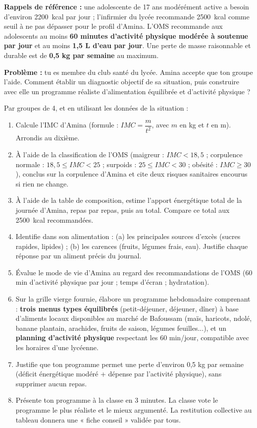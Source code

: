 \documentclass[11pt]{article}
\newcounter{popsec}
\newcounter{popsub}
\newcommand{\courssub}[1]{%
  \stepcounter{popsub}%
  \par\vspace{9pt}\noindent{\popxbold\fontsize{11.5}{13}\selectfont\color{popink}{\color{poporange}\thepopsec.\thepopsub}\hspace{6pt}#1}\par\nopagebreak\vspace{4pt}
}
\begin{document}
\textbf{Rappels de référence :} une adolescente de 17 ans modérément active a besoin d'environ \SI{2200}{kcal} par jour ; l'infirmier du lycée recommande \SI{2500}{kcal} comme seuil à ne pas dépasser pour le profil d'Amina. L'OMS recommande aux adolescents au moins \textbf{60 minutes d'activité physique modérée à soutenue par jour} et au moins \textbf{1,5 L d'eau par jour}. Une perte de masse raisonnable et durable est de \textbf{0,5 kg par semaine} au maximum.

\textbf{Problème :} tu es membre du club santé du lycée. Amina accepte que ton groupe l'aide. Comment établir un diagnostic objectif de sa situation, puis construire avec elle un programme réaliste d'alimentation équilibrée et d'activité physique ?

\courssub{Consignes}

Par groupes de 4, et en utilisant les données de la situation :

\begin{enumerate}
\item Calcule l'IMC d'Amina (formule : $IMC = \dfrac{m}{t^2}$, avec $m$ en kg et $t$ en m). Arrondis au dixième.
\item À l'aide de la classification de l'OMS (maigreur : $IMC < 18,5$ ; corpulence normale : $18,5 \leq IMC < 25$ ; surpoids : $25 \leq IMC < 30$ ; obésité : $IMC \geq 30$), conclus sur la corpulence d'Amina et cite deux risques sanitaires encourus si rien ne change.
\item À l'aide de la table de composition, estime l'apport énergétique total de la journée d'Amina, repas par repas, puis au total. Compare ce total aux \SI{2500}{kcal} recommandées.
\item Identifie dans son alimentation : (a) les principales sources d'excès (sucres rapides, lipides) ; (b) les carences (fruits, légumes frais, eau). Justifie chaque réponse par un aliment précis du journal.
\item Évalue le mode de vie d'Amina au regard des recommandations de l'OMS (60 min d'activité physique par jour ; temps d'écran ; hydratation).
\item Sur la grille vierge fournie, élabore un programme hebdomadaire comprenant : \textbf{trois menus types équilibrés} (petit-déjeuner, déjeuner, dîner) à base d'aliments locaux disponibles au marché de Bafoussam (maïs, haricots, ndolé, banane plantain, arachides, fruits de saison, légumes feuilles...), et un \textbf{planning d'activité physique} respectant les 60 min/jour, compatible avec les horaires d'une lycéenne.
\item Justifie que ton programme permet une perte d'environ 0,5 kg par semaine (déficit énergétique modéré + dépense par l'activité physique), sans supprimer aucun repas.
\item Présente ton programme à la classe en 3 minutes. La classe vote le programme le plus réaliste et le mieux argumenté. La restitution collective au tableau donnera une « fiche conseil » validée par tous.
\end{enumerate}
\end{document}
